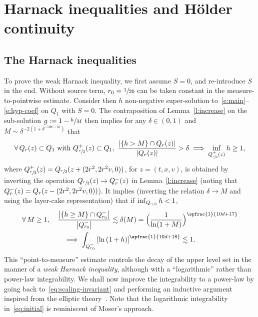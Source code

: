 \section{Harnack inequalities and Hölder continuity}
\label{sec:Harnack}

\subsection{The Harnack inequalities}

To prove the weak Harnack inequality, we first assume $S=0$, and
re-introduce $S$ in the end. Without source term,
$r_0=\sfrac{1}{20}$ can be taken constant in the
measure-to-pointwise estimate. Consider then $h$ non-negative
super-solution to~\eqref{e:main}--\eqref{e:hyp-coef} on $Q_1$ with
$S=0$. The contraposition of Lemma~\ref{l:increase} on the
sub-solution $g := 1 - \sfrac{h}{M}$ then implies for any
$\delta \in (0,1)$ and $M \sim \delta^{-2 (1+\delta^{-10d-16})}$
that
\begin{equation}
\label{eq:scaling-invariant}
\forall \, Q_r(z) \subset Q_1 \text{ with }
Q_{\sfrac{r}{2}}^{+}(z) \subset Q_1, \
\frac{\left| \{ h > M \} \cap Q_{r}(z) \right|}{\left|
Q_{r}(z) \right|} > \delta \implies \inf_{Q_{\sfrac{r}{2}}^+(z)} h \ge 1,
\end{equation}
where
$Q_{\sfrac{r}{2}}^{+}(z) = Q_{\sfrac{r}{2}}(z +(2r^2,2r^2v,0))$,
for $z=(t,x,v)$, is obtained by inverting the operation
$Q_{\sfrac{r}{2}}(z) \to Q_{r}^-(z)$ in Lemma~\ref{l:increase}
(noting that $Q_r^-(z)=Q_r(z-\nobreak(2r^2,2r^2v,0))$). It implies
(inverting the relation $\delta \to M$ and using the layer-cake
representation) that if $\inf_{Q_{\sfrac{r_0}{2}}} h <1$,
\begin{multline}
\label{eq:initial}
\forall \, M \ge 1, \quad \frac{\left| \{ h \ge M \} \cap
Q_{r_0}^- \right|}{\left|Q_{r_0}^- \right|} \lesssim
\delta(M) =\Bigl( \frac{1}{ \ln (1+M)}
\Bigr)^{\spfrac{1}{10d+17}} \\
\implies
\int_{Q_{r_0}^- } \left[ \ln \left( 1+ h \right)
\right]^{\spfrac{1}{10d+18}} \lesssim 1.
\end{multline}
This ``point-to-measure'' estimate controls the decay of the
upper level set in the manner of a \emph{weak Harnack
inequality}, although with a ``logarithmic'' rather than
power-law integrability. We shall now improve the integrability
to a power-law by going back to~\eqref{eq:scaling-invariant} and
performing an inductive argument inspired from the elliptic
theory~\cite{MR3565366}. Note that the logarithmic integrability
in~\eqref{eq:initial} is reminiscent of Moser's approach.

